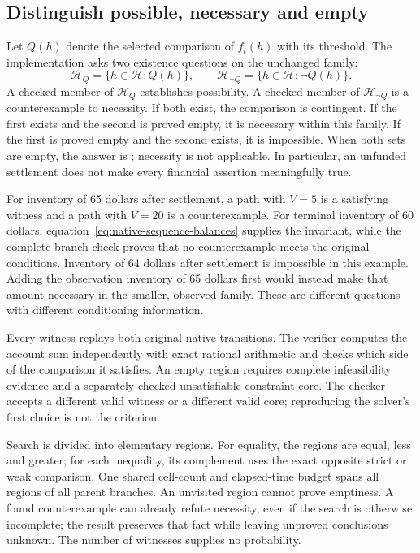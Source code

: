\subsection{Distinguish possible, necessary and empty}

Let \(Q(h)\) denote the selected comparison of \(f_t(h)\) with its threshold.
The implementation asks two existence questions on the unchanged family:
\begin{equation}
\label{eq:family-outcome-partition}
 \mathcal H_Q=\{h\in\mathcal H:Q(h)\},\qquad
 \mathcal H_{\neg Q}=\{h\in\mathcal H:\neg Q(h)\}.
\end{equation}
A checked member of \(\mathcal H_Q\) establishes possibility. A checked
member of \(\mathcal H_{\neg Q}\) is a counterexample to necessity. If both
exist, the comparison is contingent. If the first exists and the second is
proved empty, it is necessary within this family. If the first is proved empty
and the second exists, it is impossible. When both sets are empty, the answer
is ; necessity is not applicable. In particular, an
unfunded settlement does not make every financial assertion meaningfully true.

For inventory of 65 dollars after settlement, a path with \(V=5\) is a satisfying
witness and a path with \(V=20\) is a counterexample. For terminal inventory of 60 dollars,
equation~\eqref{eq:native-sequence-balances} supplies the invariant, while
the complete branch check proves that no counterexample meets the original
conditions. Inventory of 64 dollars after settlement is impossible in this example.
Adding the observation inventory of 65 dollars first would instead make that amount
necessary in the smaller, observed family. These are different questions with
different conditioning information.

Every witness replays both original native transitions. The verifier computes
the account sum independently with exact rational arithmetic and checks which
side of the comparison it satisfies. An empty region requires complete
infeasibility evidence and a separately checked unsatisfiable constraint core.
The checker accepts a different valid witness or a different valid core;
reproducing the solver's first choice is not the criterion.

Search is divided into elementary regions. For equality, the regions are
equal, less and greater; for each inequality, its complement uses the exact
opposite strict or weak comparison. One shared cell-count and elapsed-time budget spans all
regions of all parent branches. An unvisited region cannot prove emptiness.
A found counterexample can already refute necessity, even if the search is
otherwise incomplete; the result preserves that fact while leaving unproved
conclusions unknown. The number of witnesses supplies no probability.

